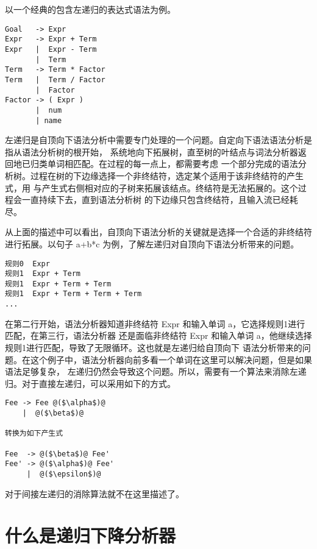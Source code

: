 以一个经典的包含左递归的表达式语法为例。

\begin{lstlisting}[caption={经典表达式文法}]
Goal   -> Expr
Expr   -> Expr + Term
Expr   |  Expr - Term
       |  Term
Term   -> Term * Factor
Term   |  Term / Factor
       |  Factor
Factor -> ( Expr )
       |  num
       | name
\end{lstlisting}

左递归是自顶向下语法分析中需要专门处理的一个问题。自定向下语法语法分析是指从语法分析树的根开始，
系统地向下拓展树，直至树的叶结点与词法分析器返回地已归类单词相匹配。在过程的每一点上，都需要考虑
一个部分完成的语法分析树。过程在树的下边缘选择一个非终结符，选定某个适用于该非终结符的产生式，用
与产生式右侧相对应的子树来拓展该结点。终结符是无法拓展的。这个过程会一直持续下去，直到语法分析树
的下边缘只包含终结符，且输入流已经耗尽。

从上面的描述中可以看出，自顶向下语法分析的关键就是选择一个合适的非终结符进行拓展。以句子
a+b*c 为例，了解左递归对自顶向下语法分析带来的问题。

\begin{lstlisting}[caption={自顶向下语法分析 a+b*c}]
规则0  Expr
规则1  Expr + Term
规则1  Expr + Term + Term
规则1  Expr + Term + Term + Term
...
\end{lstlisting}

在第二行开始，语法分析器知道非终结符 Expr 和输入单词 a，它选择规则1进行匹配，在第三行，语法分析器
还是面临非终结符 Expr 和输入单词 a，他继续选择规则1进行匹配，导致了无限循环。这也就是左递归给自顶向下
语法分析带来的问题。在这个例子中，语法分析器向前多看一个单词在这里可以解决问题，但是如果语法足够复杂，
左递归仍然会导致这个问题。所以，需要有一个算法来消除左递归。对于直接左递归，可以采用如下的方式。

\begin{lstlisting}[caption={消除直接左递归}]
Fee -> Fee @($\alpha$)@
    |  @($\beta$)@
    
转换为如下产生式

Fee  -> @($\beta$)@ Fee'
Fee' -> @($\alpha$)@ Fee'
     |  @($\epsilon$)@
\end{lstlisting}

对于间接左递归的消除算法就不在这里描述了。

\section*{什么是递归下降分析器}
